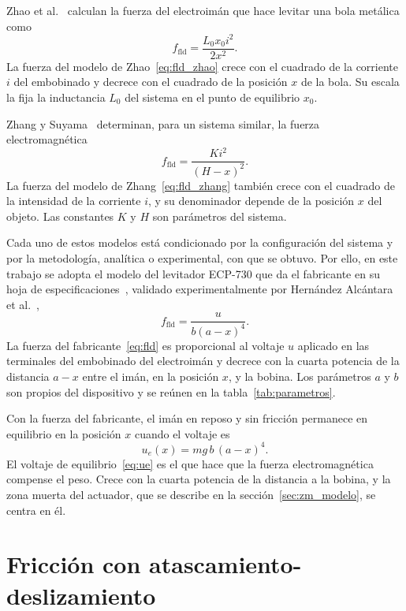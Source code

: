 Zhao et al.~\cite{zhao} calculan la fuerza del electroimán que hace levitar una bola metálica como
\begin{equation}
f_{\text{fld}} = \frac{L_0 x_0 i^2}{2x^2} .
\label{eq:fld_zhao}
\end{equation}
La fuerza del modelo de Zhao~\eqref{eq:fld_zhao} crece con el cuadrado de la corriente $i$ del embobinado y decrece con el cuadrado de la posición $x$ de la bola. Su escala la fija la inductancia $L_0$ del sistema en el punto de equilibrio $x_0$.

Zhang y Suyama~\cite{feifei} determinan, para un sistema similar, la fuerza electromagnética
\begin{equation}
f_{\text{fld}} = \frac{K i^2}{(H - x)^2} .
\label{eq:fld_zhang}
\end{equation}
La fuerza del modelo de Zhang~\eqref{eq:fld_zhang} también crece con el cuadrado de la intensidad de la corriente $i$, y su denominador depende de la posición $x$ del objeto. Las constantes $K$ y $H$ son parámetros del sistema.

Cada uno de estos modelos está condicionado por la configuración del sistema y por la metodología, analítica o experimental, con que se obtuvo. Por ello, en este trabajo se adopta el modelo del levitador ECP-730 que da el fabricante en su hoja de especificaciones~\cite{parks}, validado experimentalmente por Hernández Alcántara et al.~\cite{alcantara},
\begin{equation}
f_{\text{fld}} = \frac{u}{b(a-x)^4} .
\label{eq:fld}
\end{equation}
La fuerza del fabricante~\eqref{eq:fld} es proporcional al voltaje $u$ aplicado en las terminales del embobinado del electroimán y decrece con la cuarta potencia de la distancia $a-x$ entre el imán, en la posición $x$, y la bobina. Los parámetros $a$ y $b$ son propios del dispositivo y se reúnen en la tabla~\ref{tab:parametros}.

Con la fuerza del fabricante, el imán en reposo y sin fricción permanece en equilibrio en la posición $x$ cuando el voltaje es
\begin{equation}
u_e(x) = mg\,b\,(a-x)^4 .
\label{eq:ue}
\end{equation}
El voltaje de equilibrio~\eqref{eq:ue} es el que hace que la fuerza electromagnética compense el peso. Crece con la cuarta potencia de la distancia a la bobina, y la zona muerta del actuador, que se describe en la sección~\ref{sec:zm_modelo}, se centra en él.

\section{Fricción con atascamiento-deslizamiento}\label{sec:friccion_modelo}

